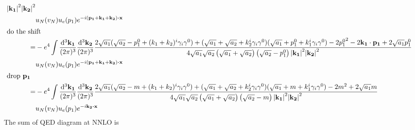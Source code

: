 \documentclass{article}
\newcommand{\g}{\gamma}
\begin{document}
\begin{align*}
{  {\vb{\abs{k_1}}^2\vb{\abs{k_2}}^2}}\\&
u_N(v_N)u_e(p_1)e^{-i\vb{(p_1+k_1+k_2)}\vdot \vb{x}}\\
\intertext{do the shift}
  =&-e^4\int\frac{\dd^3\vb{k_1}}{(2\pi)^3}\frac{\dd^3\vb{k_2}}{(2\pi)^3}
  \frac{2\sqrt{a_1}(\sqrt{a_2}-p_1^0+(k_1+k_2)^i\g_i\g^0)+(\sqrt{a_1}+\sqrt{a_2}+k_2^i\g_i\g^0)(\sqrt{a_1}+p_1^0+k_1^i\g_i\g^0)-2{p_1^0}^2-2\vb{k_1\cdot p_1}+2\sqrt{a_1}p_1^0}{4 \sqrt{a_1} \sqrt{a_2} \left(\sqrt{a_1}+\sqrt{a_2}\right) \left(\sqrt{a_2}-p_1^0\right)
  {\vb{\abs{k_1}}^2\vb{\abs{k_2}}^2}}\\&
u_N(v_N)u_e(p_1)e^{-i\vb{(p_1+k_1+k_2)}\vdot \vb{x}}\\
\intertext{drop $\vb{p_1}$}
  =&-e^4\int\frac{\dd^3\vb{k_1}}{(2\pi)^3}\frac{\dd^3\vb{k_2}}{(2\pi)^3}
  \frac{2\sqrt{a_1}(\sqrt{a_2}-m+(k_1+k_2)^i\g_i\g^0)+(\sqrt{a_1}+\sqrt{a_2}+k_2^i\g_i\g^0)(\sqrt{a_1}+m+k_1^i\g_i\g^0)-2m^2+2\sqrt{a_1}m}{4 \sqrt{a_1} \sqrt{a_2} \left(\sqrt{a_1}+\sqrt{a_2}\right) \left(\sqrt{a_2}-m\right)
  {\vb{\abs{k_1}}^2\vb{\abs{k_2}}^2}}\\&
u_N(v_N)u_e(p_1)e^{-i\vb{k_2}\vdot \vb{x}}\\
\end{align*}
The sum of QED diagram at NNLO is
\end{document}
